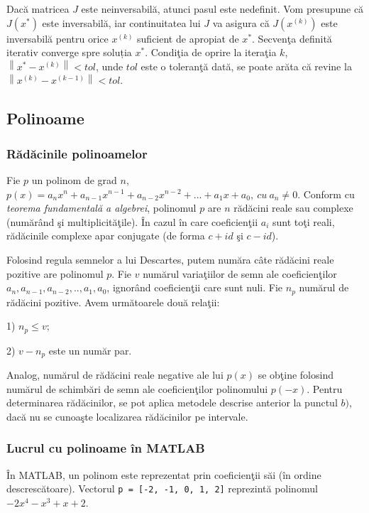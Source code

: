 \documentclass{exam}
\begin{document}
Dacă matricea $J$ este neinversabilă, atunci pasul este nedefinit. Vom presupune că $J(x^*)$ este inversabilă, iar continuitatea lui $J$ va asigura că $J(x^{(k)})$ este inversabilă pentru orice $x^{(k)}$ suficient de apropiat de $x^*$.
Secvenţa definită iterativ converge spre soluția $x^*$.
Condiţia de oprire la iteraţia $k$, $\left \|x^{*}-x^{(k)}  \right \|<tol$, unde $tol$ este o toleranţă dată, se poate arăta că revine la $\left \|x^{(k)}-x^{(k-1)}  \right \|<tol.$

\subsection{Polinoame}

\subsubsection{Rădăcinile polinoamelor}

Fie $p$ un polinom de grad $n$, $p(x)= a_{n}x^{n}+a_{n-1}x^{n-1}+a_{n-2}x^{n-2}+...+a_{1}x+a_{0}, \: cu \: a_{n}\neq 0$.
Conform cu \textit{teorema fundamentală a algebrei}, polinomul $p$ are $n$ rădăcini reale sau complexe (numărând şi multiplicităţile). În cazul în care coeficienţii $a_{i}$ sunt toţi reali,  rădăcinile complexe apar conjugate (de forma $c+id$ şi $c-id$).

Folosind regula semnelor a lui Descartes, putem număra câte rădăcini reale pozitive are polinomul $p$. Fie $v$ numărul variaţiilor de semn ale coeficienţilor $a_{n}, a_{n-1}, a_{n-2},.., a_{1},a_{0}$, ignorând coeficienţii care sunt nuli. Fie $n_{p}$ numărul de rădăcini pozitive. Avem următoarele două relaţii:

1) $n_{p}\leq v;$

2) $v-n_{p}$ este un număr par.

Analog, numărul de rădăcini reale negative ale lui $p(x)$ se obţine folosind numărul de schimbări de semn ale coeficienţilor polinomului  $p(-x)$.
Pentru determinarea rădăcinilor, se pot aplica metodele descrise anterior la punctul $b)$, dacă nu se cunoaşte localizarea rădăcinilor pe intervale.

\subsubsection{Lucrul cu polinoame în MATLAB}

În MATLAB, un polinom este reprezentat prin coeficienţii săi (în ordine descrescătoare). Vectorul \verb|p = [-2, -1, 0, 1, 2]| reprezintă polinomul $-2x^{4}-x^{3}+x+2$.
\end{document}
